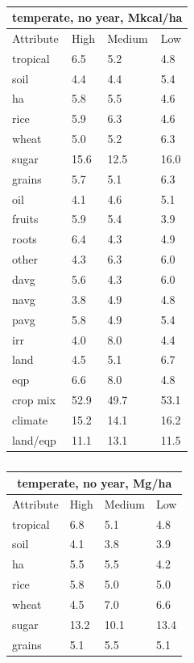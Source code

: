\documentclass[11pt]{article}
\begin{document}
\begin{table}
\parbox{.45\linewidth} {
\centering
\begin{tabular}{llll}
\toprule
\multicolumn{4}{c}{\textbf{temperate, no year, Mkcal/ha}} \\
\midrule
Attribute & High & Medium & Low \\
\midrule
tropical & 6.5 & 5.2 & 4.8 \\
soil & 4.4 & 4.4 & 5.4 \\
ha & 5.8 & 5.5 & 4.6 \\
rice & 5.9 & 6.3 & 4.6 \\
wheat & 5.0 & 5.2 & 6.3 \\
sugar & 15.6 & 12.5 & 16.0 \\
grains & 5.7 & 5.1 & 6.3 \\
oil & 4.1 & 4.6 & 5.1 \\
fruits & 5.9 & 5.4 & 3.9 \\
roots & 6.4 & 4.3 & 4.9 \\
other & 4.3 & 6.3 & 6.0 \\
davg & 5.6 & 4.3 & 6.0 \\
navg & 3.8 & 4.9 & 4.8 \\
pavg & 5.8 & 4.9 & 5.4 \\
irr & 4.0 & 8.0 & 4.4 \\
land & 4.5 & 5.1 & 6.7 \\
eqp & 6.6  & 8.0 & 4.8 \\
\midrule
crop mix & 52.9 & 49.7 & 53.1 \\
climate & 15.2 & 14.1 & 16.2 \\
land/eqp & 11.1 & 13.1 & 11.5 \\
\bottomrule
\end{tabular}
\caption{ }
\label{k.ny.temp_percents}
}
\parbox{.45\linewidth} {
\centering
\begin{tabular}{llll}
\toprule
\multicolumn{4}{c}{\textbf{temperate, no year, Mg/ha}} \\
\midrule
Attribute & High & Medium & Low \\
\midrule
tropical & 6.8 & 5.1 & 4.8 \\
soil & 4.1 & 3.8 & 3.9 \\
ha & 5.5 & 5.5 & 4.2 \\
rice & 5.8 & 5.0 & 5.0 \\
wheat & 4.5 & 7.0 & 6.6 \\
sugar & 13.2 & 10.1 & 13.4 \\
grains & 5.1 & 5.5 & 5.1 \\

\end{tabular}}
\end{table}
\end{document}

